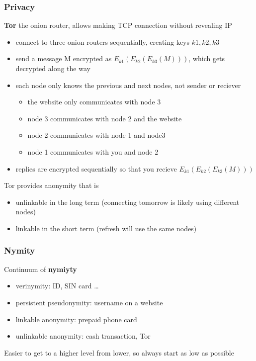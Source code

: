 \documentclass[]{article}
\theoremstyle{definition}
\begin{document}
	\subsubsection{Privacy}
	\textbf{Tor} the onion router, allows making TCP connection without revealing IP
	\begin{itemize}
		\item connect to three onion routers sequentially, creating keys $k1, k2, k3$
		\item send a message M encrypted as $E_{k1}(E_{k2}(E_{k3}(M)))$, which gets decrypted along the way
		\item each node only knows the previous and next nodes, not sender or reciever
			\begin{itemize}
				\item the website only communicates with node 3
				\item node 3 communicates with node 2 and the website
				\item node 2 communicates with node 1 and node3
				\item node 1 communicates with you and node 2
			\end{itemize}
		\item replies are encrypted sequentially so that you recieve $E_{k1}(E_{k2}(E_{k3}(M)))$ 
	\end{itemize}
	Tor provides anonymity that is 
	\begin{itemize}
		\item unlinkable in the long term (connecting tomorrow is likely using different nodes)
		\item linkable in the short term (refresh will use the same nodes)
	\end{itemize}

	\subsubsection{Nymity}
	Continuum of \textbf{nymiyty}
	\begin{itemize}
		\item verinymity: ID, SIN card \dots
		\item persistent pseudonymity: username on a website
		\item linkable anonymity: prepaid phone card
		\item unlinkable anonymity: cash transaction, Tor
	\end{itemize}
	Easier to get to a higher level from lower, so always start as low as possible
\end{document}
